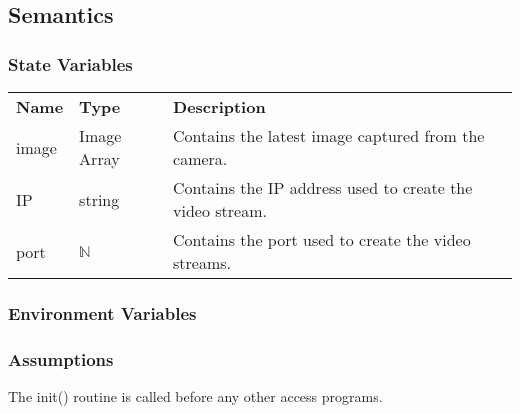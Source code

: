 \documentclass[12pt, titlepage]{article}
\begin{document}
\subsection{Semantics}
\subsubsection{State Variables}
\begin{center}
\begin{tabular}{p{3 cm} p{3cm} p{6.5cm} }
\hline
\textbf{Name} & \textbf{Type} & \textbf{Description}  \\
image & Image Array & Contains the latest image captured from the camera. \\
IP & string & Contains the IP address used to create the video stream. \\
port & $\mathbb{N}$ & Contains the port used to create the video streams. \\
\hline
\hline
\end{tabular}
\end{center}
\subsubsection{Environment Variables}
\subsubsection{Assumptions}
The init() routine is called before any other access programs.
\end{document}

